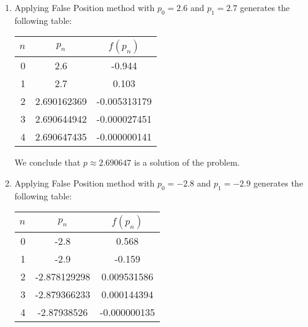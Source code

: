 \documentclass[../../../../Assignments]{subfiles}
\begin{document}
\begin{solution}
    \begin{enumerate}[label= \alph*)]
        \item Applying False Position method with \(p_0 = \num{2.6}\) and \(p_1
            = \num{2.7}\) generates the following table:

            \begin{table}[H]
                \centering
                \begin{tabular}{r S[table-format=1.9] S[table-format=-1.9]}
                    \toprule
                    \(n\)  &   {\(p_n\)}   &  {\(f(p_n)\)}  \\
                      &  2.6          &  -0.944        \\
                        1  &  2.7          &   0.103        \\
                        2  &  2.690162369  &  -0.005313179  \\
                        3  &  2.690644942  &  -0.000027451  \\
                        4  &  2.690647435  &  -0.000000141  \\
                    \bottomrule
                \end{tabular}
            \end{table}

            We conclude that \(p \approx \num{2.690647}\) is a solution of the
            problem.

        \item Applying False Position method with \(p_0 = \num{-2.8}\) and \(p_1
            = \num{-2.9}\) generates the following table:

            \begin{table}[H]
                \centering
                \begin{tabular}{r S[table-format=-1.9] S[table-format=-1.9]}
                    \toprule
                    \(n\)  &    {\(p_n\)}   &  {\(f(p_n)\)}  \\
                      &  -2.8          &   0.568        \\
                        1  &  -2.9          &  -0.159        \\
                        2  &  -2.878129298  &   0.009531586  \\
                        3  &  -2.879366233  &   0.000144394  \\
                        4  &  -2.87938526   &  -0.000000135  \\
                        \bottomrule
                \end{tabular}
            \end{table}


\end{enumerate}
\end{solution}
\end{document}
